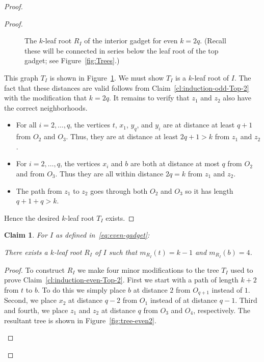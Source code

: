 \documentclass[11pt,letter]{article}
\newtheorem{claim}[theorem]{Claim}
\theoremstyle{remark}
\begin{document}
\begin{proof}
\begin{proof}
\begin{figure}[h!]
        \caption{The $k$-leaf root $R_I$ of the interior gadget for even $k=2q$. (Recall these will be connected in series below the leaf root of the top gadget; see Figure~\ref{fig:Trees}.)}\label{fig:tree-even1}
    \end{figure}
This graph $T_I$ is shown in Figure~\ref{fig:tree-even1}.
We must show $T_I$ is a $k$-leaf root of $I$. 
    The fact that these distances are valid follows from Claim~\ref{cl:induction-odd-Top-2} with the modification that $k=2q$. It remains to verify that $z_1$ and $z_2$ also have the correct neighborhoods.
        \begin{itemize}
            \item For all $i=2,\dots, q$, the vertices $t$, $x_1$, $y_q$, and $y_i$ are at distance at least $q+1$ from $O_2$ and $O_3$. Thus, they are at distance at least $2q+1 > k$ from $z_1$ and $z_2$.
            \item For $i=2,\dots,q$, the vertices $x_i$ and $b$ are both at distance at most $q$ from $O_2$ and from $O_3$. Thus they are all within distance $2q=k$ from $z_1$ and $z_2$.
            \item The path from $z_1$ to $z_2$ goes through both $O_2$ and $O_3$ so it has length $q+1+q>k$.
        \end{itemize}
        Hence the desired $k$-leaf root $T_I$ exists.
    \end{proof}


    
    \begin{claim}\label{cl:induction-even-Bot}
        For $I$ as defined in~\ref{eq:even-gadget}:
        
        There exists a $k$-leaf root $R_I$ of $I$ such that $m_{R_I}(t)=k-1$ and $m_{R_I}(b)=4$.
    \end{claim}
    \begin{proof}

To construct $R_I$ we make four minor modifications to the tree $T_I$ used to prove Claim~\ref{cl:induction-even-Top-2}. First we start with a path of length $k+2$ from $t$ to $b$.
To do this we simply place $b$ at distance $2$ from $O_{q+1}$ instead of $1$. 
Second, we place $x_2$ at distance $q-2$ from $O_1$ instead of at distance $q-1$. Third and fourth, we place $z_1$ and $z_2$ at distance $q$ from $O_3$ and $O_4$, respectively.
The resultant tree is shown in Figure~\ref{fig:tree-even2}.
\begin{figure}[h!]
        \centering
        

\end{figure}
\end{proof}
\end{proof}
\end{document}
